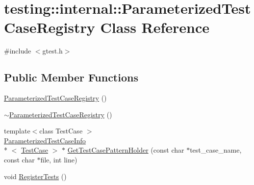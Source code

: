 \hypertarget{classtesting_1_1internal_1_1_parameterized_test_case_registry}{\section{testing\-:\-:internal\-:\-:Parameterized\-Test\-Case\-Registry Class Reference}
\label{classtesting_1_1internal_1_1_parameterized_test_case_registry}
}


{\ttfamily \#include $<$gtest.\-h$>$}

\subsection*{Public Member Functions}
\begin{DoxyCompactItemize}
\item 
\hyperlink{classtesting_1_1internal_1_1_parameterized_test_case_registry_aacafaaf78ca09bbd9f5eed93ae2b6225}{Parameterized\-Test\-Case\-Registry} ()
\item 
\hyperlink{classtesting_1_1internal_1_1_parameterized_test_case_registry_a695c86db8545a3745873190b91a13c9f}{$\sim$\-Parameterized\-Test\-Case\-Registry} ()
\item 
{\footnotesize template$<$class Test\-Case $>$ }\\\hyperlink{classtesting_1_1internal_1_1_parameterized_test_case_info}{Parameterized\-Test\-Case\-Info}\\*
$<$ \hyperlink{classtesting_1_1_test_case}{Test\-Case} $>$ $\ast$ \hyperlink{classtesting_1_1internal_1_1_parameterized_test_case_registry_af81b3fffa8c9a26256417b85aceb9e80}{Get\-Test\-Case\-Pattern\-Holder} (const char $\ast$test\-\_\-case\-\_\-name, const char $\ast$file, int line)
\item 
void \hyperlink{classtesting_1_1internal_1_1_parameterized_test_case_registry_ad5b63c8fe94f3d51d039a76c001c9223}{Register\-Tests} ()
\end{DoxyCompactItemize}


